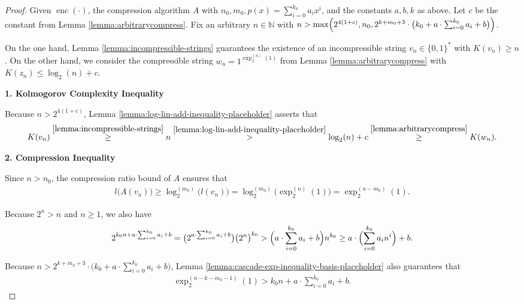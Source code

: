 \begin{proof}
	Given $\operatorname{enc}(\cdot)$, the compression algorithm $A$ with $n_0,m_0,p(x)=\sum_{i=0}^{k_0}a_ix^i$, and the constants $a,b,k$ as above.
	Let $c$ be the constant from Lemma \ref{lemma:arbitrarycompress}.
	Fix an arbitrary $n\in\mathbb{N}$ with $n>\max\Bigl(2^{4 (1+c)},n_0,2^{k+m_0+3}\cdot\bigl(k_0+a\cdot \sum_{i=0}^{k_0}a_i + b\bigr)\Bigr)$.
	
	On the one hand, Lemma \ref{lemma:incompressible-strings} guarantees the existence of an incompressible string $v_n\in\{0,1\}^{*}$ with $K(v_n)\geq n$.
	On the other hand, we consider the compressible string $w_n=1^{\exp_2^{(n)}(1)}$ from Lemma \ref{lemma:arbitrarycompress} with $K(z_n)\leq \log_2(n)+c$.
	
	\textbf{1. Kolmogorov Complexity Inequality}
	
	Because $n>2^{4(1+c)}$, Lemma \ref{lemma:log-lin-add-inequality-placeholder} asserts that 
	\begin{align}
		K(v_n)\overset{\ref{lemma:incompressible-strings}}{\geq} n \overset{\ref{lemma:log-lin-add-inequality-placeholder}}{>} \log_2(n)+c \overset{\ref{lemma:arbitrarycompress}}{\geq} K(w_n).
	\end{align}
	
	\textbf{2. Compression Inequality}
	
	Since $n>n_0$, the compression ratio bound of $A$ ensures that
	\begin{align}
		\label{eq:theorem-arbitrary-order-inconsistency-avn-to-exp-m0}
		l\bigl(A(v_n)\bigr)\geq \log_2^{(m_0)}\bigl(l(v_n)\bigr) = \log_2^{(m_0)}\bigl(\exp_2^{(n)}(1)\bigr)=\exp_2^{(n-m_0)}(1).
	\end{align}
	
	Because $2^n>n$ and $n\geq 1$, we also have
	\begin{align}
		\label{eq:theorem-arbitrary-order-inconsistency-exp-to-p}
		2^{k_0n+a\cdot \sum_{i=0}^{k_0}a_i + b} = \bigl(2^{a\cdot \sum_{i=0}^{k_0}a_i + b}\bigr)\bigl(2^{n}\bigr)^{k_0}>\Bigl(a\cdot \sum_{i=0}^{k_0}a_i + b\Bigr) n^{k_0} \geq a\cdot \Bigl( \sum_{i=0}^{k_0}a_in^{i} \Bigr) + b. 
	\end{align}
	
	Because $n>2^{k+m_0+3}\cdot\bigl(k_0+a\cdot \sum_{i=0}^{k_0}a_i + b\bigr)$, Lemma \ref{lemma:cascade-exp-inequality-basis-placeholder} also guarantees that 
	\begin{align}
		\label{eq:theorem-arbitrary-order-inconsistency-exp-to-lin}
		\exp_2^{(n-k-m_0-1)}(1)> k_0n+a\cdot \sum_{i=0}^{k_0}a_i + b.
	\end{align}
	

\end{proof}
